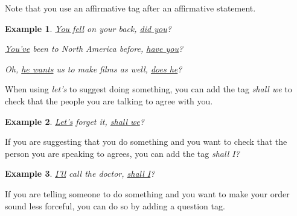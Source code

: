 \documentclass[oneside]{book}
\numberwithin{equation}{section}
\newtheorem{example}{Example}[section]
\begin{document}
Note that you use an affirmative tag after an affirmative statement.
\begin{example}
    \underline{You fell} on your back, \underline{did you}?
    
    \underline{You've} been to North America before, \underline{have you}?
    
    Oh, \underline{he wants} us to make films as well, \underline{does he}?
\end{example}
When using \textit{let's} to suggest doing something, you can add the tag \textit{shall we} to check that the people you are talking to agree with you.
\begin{example}
    \underline{Let's} forget it, \underline{shall we}?
\end{example}
If you are suggesting that you do something and you want to check that the person you are speaking to agrees, you can add the tag \textit{shall I?}
\begin{example}
    \underline{I'll} call the doctor, \underline{shall I}?
\end{example}
If you are telling someone to do something and you want to make your order sound less forceful, you can do so by adding a question tag.
\end{document}
